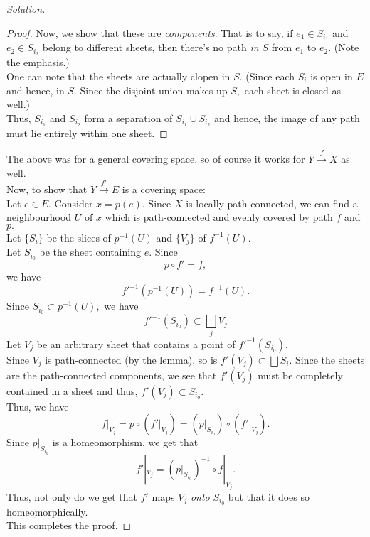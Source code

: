 \documentclass[12pt]{article}
\theoremstyle{definition}
\numberwithin{thm}{section}
\newenvironment{blockquote}
{\begin{mdframed}[skipabove=0pt, skipbelow=0pt, innertopmargin=4pt, innerbottommargin=4pt, bottomline=false,topline=false,rightline=false, linewidth=2pt]}
{\end{mdframed}}
\newenvironment{soln}{\begin{proof}[Solution]}{\end{proof}}
\begin{document}
\begin{soln}
\begin{blockquote}
\begin{proof}
			Now, we show that these are \emph{components}. That is to say, if $e_1 \in S_{i_1}$ and $e_2 \in S_{i_2}$ belong to different sheets, then there's no path \emph{in $S$} from $e_1$ to $e_2.$ (Note the emphasis.)\\
			One can note that the sheets are actually clopen in $S.$ (Since each $S_i$ is open in $E$ and hence, in $S.$ Since the disjoint union makes up $S,$ each sheet is closed as well.)\\
			Thus, $S_{i_1}$ and $S_{i_2}$ form a separation of $S_{i_1}\cup S_{i_2}$ and hence, the image of any path must lie entirely within one sheet.
		\end{proof}
	\end{blockquote}
	The above was for a general covering space, so of course it works for $Y \overset{f}{\longrightarrow} X$ as well.\\
	Now, to show that $Y\overset{f'}{\longrightarrow}E$ is a covering space:\\
	Let $e \in E.$ Consider $x = p(e).$ Since $X$ is locally path-connected, we can find a neighbourhood $U$ of $x$ which is path-connected and evenly covered by path $f$ and $p.$\\
	Let $\{S_i\}$ be the slices of $p^{-1}(U)$ and $\{V_j\}$ of $f^{-1}(U).$\\
	Let $S_{i_0}$ be the sheet containing $e.$ Since
	\begin{equation*} 
		p\circ f' = f,
	\end{equation*}
	we have
	\begin{equation*} 
		f'^{-1}(p^{-1}(U)) = f^{-1}(U).
	\end{equation*}
	Since $S_{i_0} \subset p^{-1}(U),$ we have 
	\begin{equation*} 
		f'^{-1}(S_{i_0}) \subset \bigsqcup_j V_j
	\end{equation*}
	Let $V_j$ be an arbitrary sheet that contains a point of $f'^{-1}(S_{i_0}).$\\
	Since $V_j$ is path-connected (by the lemma), so is $f'(V_j) \subset \bigsqcup S_i.$ Since the sheets are the path-connected components, we see that $f'(V_j)$ must be completely contained in a sheet and thus, $f'(V_j) \subset S_{i_0}.$ \\
	Thus, we have
	\begin{equation*} 
		f|_{V_j} = p\circ(f'|_{V_j}) = \left(p|_{S_{i_0}}\right)\circ\left(f'|_{V_j}\right).
	\end{equation*}
	Since $p|_{S_{i_0}}$ is a homeomorphism, we get that
	\begin{equation*} 
		f'|_{V_j} = \left(p|_{S_{i_0}}\right)^{-1}\circ f|_{V_j}.
	\end{equation*}
	Thus, not only do we get that $f'$ maps $V_j$ \emph{onto} $S_{i_0}$ but that it does so homeomorphically.\\
	This completes the proof.	
\end{soln}
\end{document}
